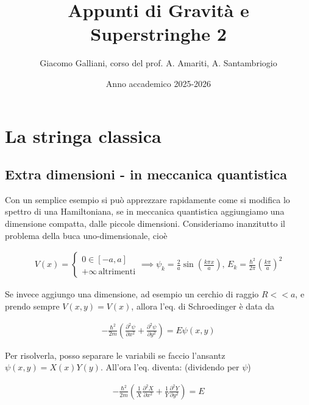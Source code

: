 \documentclass{report}
\title{\Huge{\textbf{Appunti di Gravità e Superstringhe 2}}}
\author{Giacomo Galliani, corso del prof. A. Amariti,  A. Santambriogio}
\date{Anno accademico 2025-2026}
\renewcommand{\contentsname}{Indice}
\begin{document}
\maketitle
\newpage%
\pdfbookmark[section]{\contentsname}{toc}
\tableofcontents
\pagebreak


\chapter{La stringa classica}

\section{Extra dimensioni - in meccanica quantistica}

Con un semplice esempio si può apprezzare rapidamente come si modifica lo spettro di una Hamiltoniana, se in meccanica quantistica aggiungiamo una dimensione compatta, dalle piccole dimensioni. Consideriamo inanzitutto il problema della buca uno-dimensionale, cioè 

\begin{align}
    V(x) = \begin{cases}
        0 \in [-a, a] \\
        +\infty \, \text{altrimenti}
    \end{cases} \implies \psi_k = \frac{2}{a}\sin\left(\frac{k\pi x}{a}\right), \, E_k = \frac{\hbar^2}{2\pi}\left(\frac{k\pi}{a} \right)^2
\end{align}

Se invece aggiungo una dimensione, ad esempio un cerchio di raggio \(R << a\), e prendo sempre \(V(x, y) = V(x)\), allora l'eq. di Schroedinger è data da 

\begin{align}
    -\frac{\hbar^2}{2m}\left(\frac{\partial^2\psi}{\partial x^2} + \frac{\partial^2\psi}{\partial y^2} \right) = E\psi(x, y)
\end{align}

Per risolverla, posso separare le variabili se faccio l'ansantz \(\psi(x, y) = X(x)Y(y)\). All'ora l'eq. diventa: (dividendo per \(\psi\))

\begin{align}
    -\frac{\hbar^2}{2m}\left(\frac{1}{X}\frac{\partial^2X}{\partial x^2} + \frac{1}{Y}\frac{\partial^2Y}{\partial y^2} \right) = E
\end{align}
\end{document}
